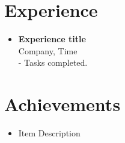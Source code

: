 \documentclass[11pt]{article}
\begin{document}
\section*{Experience}
\vspace{-0.1in}
\begin{itemize}[leftmargin=*]
    \item \textbf{Experience title} \\
    Company, Time \\
    - Tasks completed.
\end{itemize}

\section*{Achievements}
\vspace{-0.1in}
\begin{itemize}[leftmargin=*]
    \item Item Description
\end{itemize}
\end{document}
